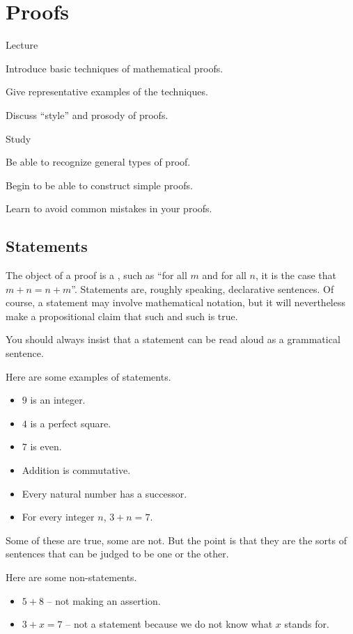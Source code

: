 \chapter{Proofs}

\begin{goals}
	\begin{goal}{Lecture}
		\item Introduce basic techniques of mathematical proofs.
		\item Give representative examples of the techniques.
		\item Discuss ``style'' and prosody of proofs.
	\end{goal}
	
	\begin{goal}{Study}
		\item Be able to recognize general types of proof.
		\item Begin to be able to construct simple proofs.
		\item Learn to avoid common mistakes in your proofs.
	\end{goal}
\end{goals}

\section{Statements}

The object of a proof is a , such as ``for all $m$ and for all $n$, it is the case that $m+n=n+m$''.
Statements are, roughly speaking,  declarative sentences. 
Of course, a statement may involve mathematical notation, but it will nevertheless make a propositional claim that such and such is true.

\begin{shout}
	You should always insist that a statement can be read aloud as a grammatical sentence.
\end{shout}

\begin{example}
	Here are some examples of statements.
	\begin{itemize}
		\item $9$ is an integer.
		\item $4$ is a perfect square.
		\item $7$ is even.
		\item Addition is commutative.
		\item Every natural number has a successor.
		\item For every integer $n$, $3+n=7$.
	\end{itemize}
	Some of these are true, some are not. But the point is that they are the sorts of sentences that can be judged to be one or the other.
	
	Here are some non-statements.
	\begin{itemize}
		\item $5+8$ -- not making an assertion.
		\item $3+x=7$ -- not a statement because we do not know what $x$ stands for.
	\end{itemize} 
\end{example}

